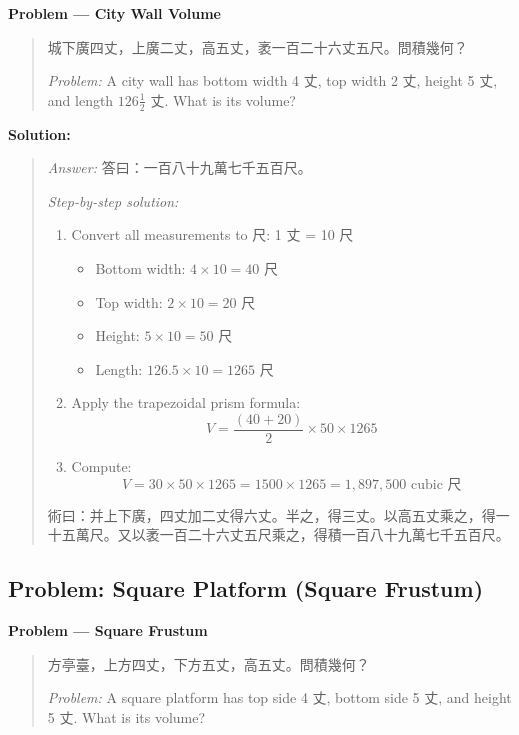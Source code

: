 \documentclass[11pt,a4paper]{article}
\newcommand{\zh}[1]{{#1}}
\newenvironment{chproblem}[1][]{%
  \par\medskip\noindent\textbf{\textcolor{sectioncolor}{#1}}\par\nopagebreak
  \begin{quote}\small
}{%
  \end{quote}\medskip
}
\newenvironment{chsolution}{%
  \par\medskip\noindent\textbf{\textcolor{notecolor}{Solution:}}\par\nopagebreak
  \begin{quote}\small
}{%
  \end{quote}\medskip
}
\newenvironment{stepbystep}{%
  \par\smallskip\noindent\textit{Step-by-step solution:}\par\nopagebreak
  \begin{enumerate}[leftmargin=2em,label=\textbf{Step \arabic*:},ref=\arabic*]
}{%
  \end{enumerate}\medskip
}
\begin{document}
\begin{chproblem}[Problem --- City Wall Volume]
\zh{城下廣四丈，上廣二丈，高五丈，袤一百二十六丈五尺。問積幾何？}

\medskip
\textit{Problem:} A city wall has bottom width 4 \zh{丈}, top width 2 \zh{丈},
height 5 \zh{丈}, and length $126\frac{1}{2}$ \zh{丈}. What is its volume?
\end{chproblem}

\begin{chsolution}
\textit{Answer:} \zh{答曰：一百八十九萬七千五百尺。}

\begin{stepbystep}
\item Convert all measurements to \zh{尺}: 1 \zh{丈} = 10 \zh{尺}
\begin{itemize}
\item Bottom width: $4 \times 10 = 40$ \zh{尺}
\item Top width: $2 \times 10 = 20$ \zh{尺}
\item Height: $5 \times 10 = 50$ \zh{尺}
\item Length: $126.5 \times 10 = 1265$ \zh{尺}
\end{itemize}

\item Apply the trapezoidal prism formula:
\[
V = \frac{(40 + 20)}{2} \times 50 \times 1265
\]

\item Compute:
\[
V = 30 \times 50 \times 1265 = 1500 \times 1265 = 1,897,500 \text{ cubic \zh{尺}}
\]
\end{stepbystep}

\zh{術曰：并上下廣，四丈加二丈得六丈。半之，得三丈。以高五丈乘之，得一十五萬尺。又以袤一百二十六丈五尺乘之，得積一百八十九萬七千五百尺。}
\end{chsolution}

\subsection{Problem: Square Platform (Square Frustum)}

\begin{chproblem}[Problem --- Square Frustum]
\zh{方亭臺，上方四丈，下方五丈，高五丈。問積幾何？}

\medskip
\textit{Problem:} A square platform has top side 4 \zh{丈}, bottom side 5
\zh{丈}, and height 5 \zh{丈}. What is its volume?
\end{chproblem}
\end{document}
